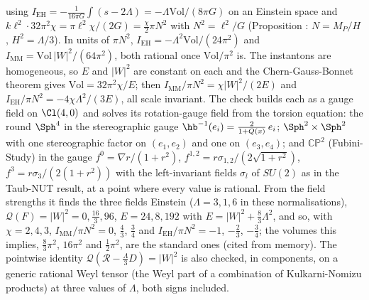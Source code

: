 using $I_{\mathrm{EH}} = -\tfrac{1}{16\pi G}\int(s - 2\Lambda) = -\Lambda\mathrm{Vol}/(8\pi G)$ on an Einstein space and $k\ell^{2}\cdot 32\pi^{2}\chi = \pi\ell^{2}\chi/(2G) = \tfrac{\chi}{2}\pi N^{2}$ with $N^{2} = \ell^{2}/G$ (Proposition : $N = M_{P}/H$, $H^{2} = \Lambda/3$). In units of $\pi N^{2}$, $I_{\mathrm{EH}} = -\Lambda^{2}\mathrm{Vol}/(24\pi^{2})$ and $I_{\mathrm{MM}} = \mathrm{Vol}\,|W|^{2}/(64\pi^{2})$, both rational once $\mathrm{Vol}/\pi^{2}$ is. The instantons are homogeneous, so $E$ and $|W|^{2}$ are constant on each and the Chern-Gauss-Bonnet theorem gives $\mathrm{Vol} = 32\pi^{2}\chi/E$; then $I_{\mathrm{MM}}/\pi N^{2} = \chi|W|^{2}/(2E)$ and $I_{\mathrm{EH}}/\pi N^{2} = -4\chi\Lambda^{2}/(3E)$, all scale invariant. The check builds each as a gauge field on $\Cl(4,0)$ and solves its rotation-gauge field from the torsion equation: the round $\Sph^{4}$ in the stereographic gauge $\hb^{-1}(e_{i}) = \tfrac{2}{1 + Q(x)}\,e_{i}$; $\Sph^{2}\times\Sph^{2}$ with one stereographic factor on $(e_{1}, e_{2})$ and one on $(e_{3}, e_{4})$; and $\mathbb{CP}^{2}$ (Fubini-Study) in the gauge $f^{0} = \nabla r/(1 + r^{2})$, $f^{1,2} = r\sigma_{1,2}/(2\sqrt{1 + r^{2}})$, $f^{3} = r\sigma_{3}/(2(1 + r^{2}))$ with the left-invariant fields $\sigma_{l}$ of $SU(2)$ as in the Taub-NUT result, at a point where every value is rational. From the field strengths it finds the three fields Einstein ($\Lambda = 3, 1, 6$ in these normalisations), $\mathcal{Q}(F) = |W|^{2} = 0, \tfrac{16}{3}, 96$, $E = 24, 8, 192$ with $E = |W|^{2} + \tfrac83\Lambda^{2}$, and so, with $\chi = 2, 4, 3$, $I_{\mathrm{MM}}/\pi N^{2} = 0$, $\tfrac43$, $\tfrac34$ and $I_{\mathrm{EH}}/\pi N^{2} = -1$, $-\tfrac23$, $-\tfrac34$; the volumes this implies, $\tfrac83\pi^{2}$, $16\pi^{2}$ and $\tfrac12\pi^{2}$, are the standard ones (cited from memory). The pointwise identity $\mathcal{Q}(\mathcal{R} - \tfrac{\Lambda}{3}D) = |W|^{2}$ is also checked, in components, on a generic rational Weyl tensor (the Weyl part of a combination of Kulkarni-Nomizu products) at three values of $\Lambda$, both signs included.

